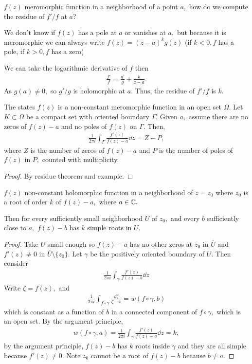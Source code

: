 \documentclass[a4paper,12pt]{article}
\begin{document}
\begin{theorem}
    $f(z)$ meromorphic function in a neighborhood of a point $a,$ how do we compute the residue of $f'/f$ at $a$?
    
    We don't know if $f(z)$ has a pole at $a$ or vanishes at $a,$ but because it is meromorphic we can always write $f(z)=(z-a)^kg(z)$ (if $k<0,f$ has a pole, if $k>0,f$ has a zero)

    We can take the logarithmic derivative of $f$ then \begin{align}
        \frac{f'}{f}=\frac{g'}{g}+\frac{k}{z-a}.
    \end{align}
    As $g(a)\neq0,$ so $g'/g$ is holomorphic at $a.$ Thus, the residue of $f'/f$ is $k.$
    
    The  states $f(z)$ is a non-constant meromorphic function in an open set $\Omega.$ Let $K\subset\Omega$ be a compact set with oriented boundary $\Gamma.$ Given $a,$ assume there are no zeros of $f(z)-a$ and no poles of $f(z)$ on $\Gamma.$ Then, \begin{align}
        \frac{1}{2\pi i}\int_\Gamma \frac{f'(z)}{f(z)-a}\dd z=Z-P,
    \end{align}
    where $Z$ is the number of zeros of $f(z)-a$ and $P$ is the number of poles of $f(z)$ in $P,$ counted with multiplicity.
    \begin{proof}
        By residue theorem and example.
    \end{proof}
\end{theorem}
\begin{theorem}
    $f(z)$ non-constant holomorphic function in a neighborhood of $z=z_0$ where $z_0$ is a root of order $k$ of $f(z)-a,$ where $a\in\mathbb{C}.$

    Then for every sufficiently small neighborhood $U$ of $z_0,$ and every $b$ sufficiently close to $a,$ $f(z)-b$ has $k$ simple roots in $U.$
    \begin{proof}
        Take $U$ small enough so $f(z)-a$ has no other zeros at $z_0$ in $\overline U$ and $f'(z)\neq0$ in $\overline U\setminus\{z_0\}.$ Let $\gamma$ be the positively oriented boundary of $U.$ Then consider \begin{align}
            \frac{1}{2\pi i}\int_\gamma\frac{f'(z)}{f(z)-b}\dd z
        \end{align}
        Write $\zeta=f(z),$ and \begin{align}
            \frac{1}{2\pi i}\int_{f\circ\gamma}\frac{\dd \zeta}{\zeta-b}=w(f\circ\gamma,b)
        \end{align}
        which is constant as a function of $b$ in a connected component of $f\circ\gamma,$ which is an open set. By the argument principle, \begin{align}
            w(f\circ\gamma,a)=\frac{1}{2\pi i}\int_\gamma\frac{f'(z)}{f(z)-a}\dd z=k,
        \end{align}
        by the argument principle, $f(z)-b$ has $k$ roots inside $\gamma$ and they are all simple because $f'(z)\neq 0.$ Note $z_0$ cannot be a root of $f(z)-b$ because $b\neq a.$
    \end{proof}
\end{theorem}
\end{document}
